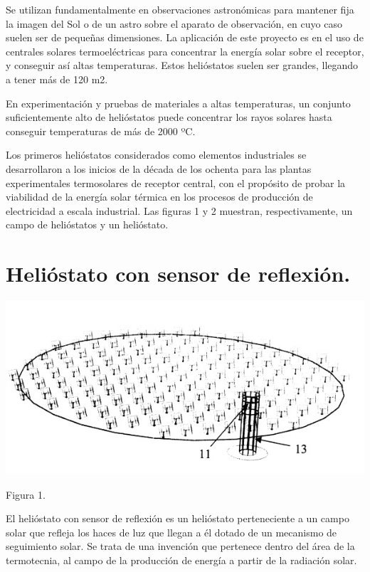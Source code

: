 Se utilizan fundamentalmente en observaciones astronómicas para mantener fija la imagen del Sol o de un astro sobre el aparato de observación, en cuyo caso suelen ser de pequeñas dimensiones. La aplicación de este proyecto es en el uso de centrales solares termoeléctricas para concentrar la energía solar sobre el receptor, y conseguir así altas temperaturas. Estos helióstatos suelen ser grandes, llegando a tener más de 120 m2.

En experimentación y pruebas de materiales a altas temperaturas, un conjunto suficientemente alto de helióstatos puede concentrar los rayos solares hasta conseguir temperaturas de más de 2000 ºC.

Los primeros helióstatos considerados como elementos industriales se desarrollaron a los inicios de la década de los ochenta para las plantas experimentales termosolares de receptor central, con el propósito de probar la viabilidad de la energía solar térmica en los procesos de producción de electricidad a escala industrial. Las figuras 1 y 2 muestran, respectivamente, un campo de helióstatos y un helióstato.

\section{Helióstato con sensor de reflexión.}

\includegraphics[scale=0.7]{unnamed (1).jpg}
\cite{OepmWebSite}

Figura 1.

El helióstato con sensor de reflexión es un helióstato perteneciente a un campo solar que refleja los haces de luz que llegan a él dotado de un mecanismo de seguimiento solar. Se trata de una invención que pertenece dentro del área de la termotecnia, al campo de la producción de energía a partir de la radiación solar.

